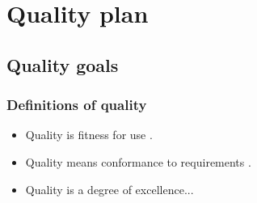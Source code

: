 \section{Quality plan}
\subsection{Quality goals}
\subsubsection{Definitions of quality}
\begin{itemize}
    \tightlist
    \item Quality is fitness for use \cite{asq2005qualityglossary}.
    \item Quality means conformance to requirements \cite{morgan1994total}.
    \item Quality is a degree of excellence...\cite{merriam2007qualitydefinition}
\end{itemize}